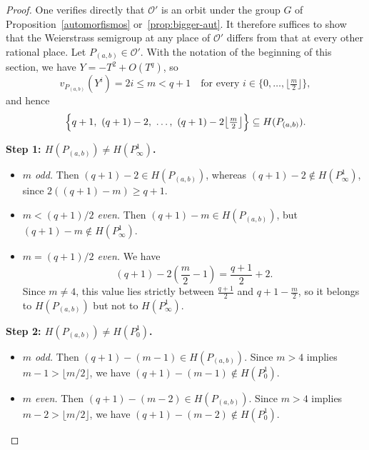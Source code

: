 \documentclass[12pt]{amsart}
\theoremstyle{remark}
\theoremstyle{definition}
\begin{document}
\begin{proof}
    One verifies directly that $\mathcal{O}'$ is an orbit under the group 
    $G$ of Proposition~\ref{automorfismos} or~\ref{prop:bigger-aut}. It 
    therefore suffices to show that the Weierstrass semigroup at any place 
    of $\mathcal{O}'$ differs from that at every other rational place. Let 
    $P_{(a,b)} \in \mathcal{O}'$. With the notation of the beginning of this 
    section, we have $Y = -T^2 + O(T^q)$, so
    \[
        v_{P_{(a,b)}}(Y^i) = 2i \le m < q+1 
        \quad \text{for every } i \in \bigl\{0, \ldots, \lfloor \tfrac{m}{2} \rfloor\bigr\},
    \]
    and hence
    \[
        \Bigl\{q+1,\ (q+1)-2,\ \ldots,\ (q+1) - 2\bigl\lfloor\tfrac{m}{2}\bigr\rfloor\Bigr\} 
        \subseteq H(P_{(a,b)}).
    \]

    \noindent\textbf{Step 1: $H(P_{(a,b)}) \neq H(P_\infty^1)$.}
    \begin{itemize}
        \item \textit{$m$ odd.} Then $(q+1) - 2 \in H(P_{(a,b)})$, 
        whereas $(q+1) - 2 \notin H(P_\infty^1)$, since 
        $2((q+1)-m) \ge q+1$.

        \item \textit{$m < (q+1)/2$ even.} Then 
        $(q+1) - m \in H(P_{(a,b)})$, but $(q+1) - m \notin H(P_\infty^1)$.

        \item \textit{$m = (q+1)/2$ even.} We have
        \[
            (q+1) - 2\!\left(\frac{m}{2} - 1\right) 
            = \frac{q+1}{2} + 2.
        \]
        Since $m \neq 4$, this value lies strictly between 
        $\frac{q+1}{2}$ and $q+1-\frac{m}{2}$, so it belongs to 
        $H(P_{(a,b)})$ but not to $H(P_\infty^1)$.
    \end{itemize}

    \noindent\textbf{Step 2: $H(P_{(a,b)}) \neq H(P_0^1)$.}
    \begin{itemize}
        \item \textit{$m$ odd.} Then 
        $(q+1) - (m-1) \in H(P_{(a,b)})$. Since $m > 4$ implies 
        $m - 1 > \lfloor m/2 \rfloor$, we have 
        $(q+1) - (m-1) \notin H(P_0^1)$.

        \item \textit{$m$ even.} Then 
        $(q+1) - (m-2) \in H(P_{(a,b)})$. Since $m > 4$ implies 
        $m - 2 > \lfloor m/2 \rfloor$, we have 
        $(q+1) - (m-2) \notin H(P_0^1)$.
    \end{itemize}


\end{proof}
\end{document}

